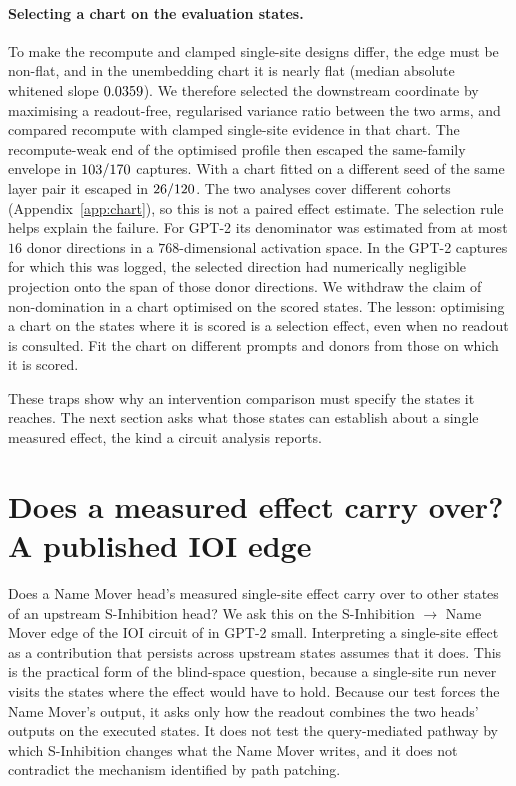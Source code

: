 \documentclass{article}
\theoremstyle{plain}
\theoremstyle{definition}
\begin{document}
\paragraph{Selecting a chart on the evaluation states.} To make the recompute and clamped single-site designs differ,
the edge must be non-flat, and in the unembedding chart it is nearly flat (median absolute whitened slope
$0.0359$). We therefore selected the downstream coordinate by maximising a readout-free, regularised variance ratio between the
two arms, and compared recompute with clamped single-site evidence in that chart. The recompute-weak end of the optimised profile then escaped the same-family envelope in
$103/170$ captures. With a chart fitted on a different seed of the same layer pair it escaped in
$26/120$. The two analyses cover different cohorts (Appendix~\ref{app:chart}), so this is not a paired
effect estimate. The selection rule helps explain the failure. For GPT-2 its denominator was estimated from at most
$16$ donor directions in a $768$-dimensional activation space. In the GPT-2 captures for which this was logged, the
selected direction had numerically negligible projection onto the span of those donor directions.  We withdraw the claim of non-domination in a chart optimised on the scored states. The
lesson: optimising a chart on the states where it is scored is a selection effect, even when no readout is consulted.
Fit the chart on different prompts and donors from those on which it is scored.

These traps show why an intervention comparison must specify the states it reaches. The next section asks what those
states can establish about a single measured effect, the kind a circuit analysis reports.

\section{Does a measured effect carry over? A published IOI edge}
\label{sec:ioi}

Does a Name Mover head's measured single-site effect carry over to other states of an upstream S-Inhibition head? We
ask this on the S-Inhibition $\to$ Name Mover edge of the IOI circuit of \citet{wang2022ioi} in GPT-2 small.
Interpreting a single-site effect as a contribution that persists across upstream states assumes that it does. This is
the practical form of the blind-space question, because a single-site run never visits the states where the effect would
have to hold. Because our test forces the Name Mover's output, it asks only how the readout combines the two heads' outputs on the
executed states. It does not test the query-mediated pathway by which S-Inhibition changes what the Name Mover
writes, and it does not contradict the mechanism \citet{wang2022ioi} identified by path patching.
\end{document}
